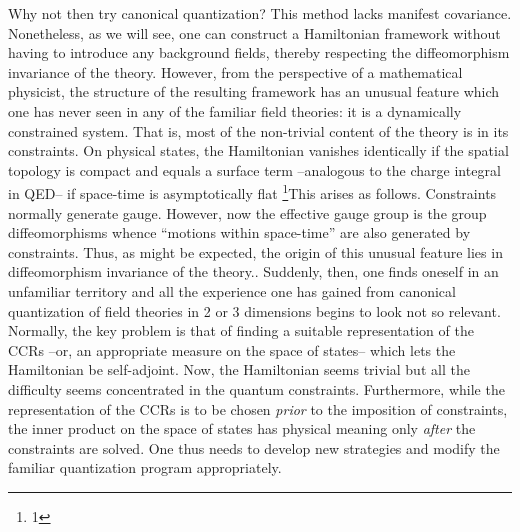 Why not then try canonical quantization? This method lacks manifest
covariance. Nonetheless, as we will see, one can construct a Hamiltonian
framework without having to introduce any background fields, thereby
respecting the diffeomorphism invariance of the theory. However, from the
perspective of a mathematical physicist, the structure of the resulting
framework has an unusual feature which one has never seen in
any of the familiar field theories: it is a dynamically constrained system.
That is, most of the non-trivial content of the theory is in its constraints.
On physical states, the Hamiltonian vanishes identically if the spatial
topology is compact and equals a surface term --analogous to the charge
integral in QED-- if space-time is asymptotically flat
\footnote{1}{This arises as follows. Constraints normally generate gauge.
However, now the effective gauge group is the group diffeomorphisms whence
``motions within space-time'' are also generated by constraints. Thus, as
might be expected, the origin of this unusual feature lies in diffeomorphism
invariance of the theory.}. Suddenly, then, one finds oneself
in an unfamiliar territory and all the experience one has gained from
canonical quantization of field theories in 2 or 3 dimensions begins to
look not so relevant. Normally, the key problem is that of finding a suitable
representation of the CCRs --or, an appropriate measure on the space of
states-- which lets the Hamiltonian be self-adjoint. Now, the Hamiltonian
seems trivial but all the difficulty seems concentrated in the quantum
constraints. Furthermore, while the representation of the CCRs is to be
chosen {\it prior} to the imposition of constraints, the inner product on
the space of states has physical meaning only {\it after} the constraints
are solved. One thus needs to develop new strategies and modify the familiar
quantization program appropriately.

